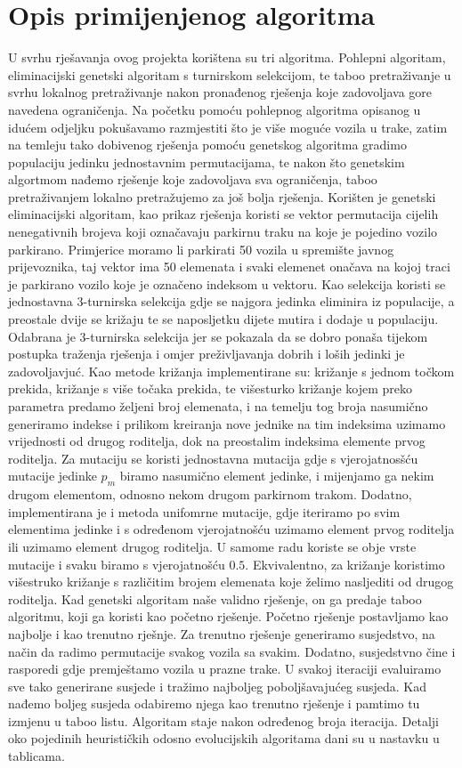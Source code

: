 \documentclass[11pt]{article}
\begin{document}
\section{Opis primijenjenog algoritma}
U svrhu rješavanja ovog projekta korištena su tri algoritma. Pohlepni algoritam, eliminacijski genetski algoritam s turnirskom selekcijom, te taboo pretraživanje u svrhu lokalnog pretraživanje nakon pronađenog rješenja koje zadovoljava gore navedena ograničenja. Na početku pomoću pohlepnog algoritma opisanog u idućem odjeljku pokušavamo razmjestiti što je više moguće vozila u trake, zatim na temleju tako dobivenog rješenja pomoću genetskog algoritma gradimo populaciju jedinku jednostavnim permutacijama, te nakon što genetskim algortmom nađemo rješenje koje zadovoljava sva ograničenja, taboo pretraživanjem lokalno pretražujemo za još bolja rješenja. Korišten je genetski eliminacijski algoritam, kao prikaz rješenja koristi se vektor permutacija cijelih nenegativnih brojeva koji označavaju parkirnu traku na koje je pojedino vozilo parkirano. Primjerice moramo li parkirati 50 vozila u spremište javnog prijevoznika, taj vektor ima 50 elemenata i svaki elemenet onačava na kojoj traci je parkirano vozilo koje je označeno indeksom u vektoru. Kao selekcija koristi se jednostavna 3-turnirska selekcija gdje se najgora jedinka eliminira iz populacije, a preostale dvije se križaju te se naposljetku dijete mutira i dodaje u populaciju. Odabrana je 3-turnirska selekcija jer se pokazala da se dobro ponaša tijekom postupka traženja rješenja i omjer preživljavanja dobrih i loših jedinki je zadovoljavjuć. Kao metode križanja implementirane su: križanje s jednom točkom prekida, križanje s više točaka prekida, te  višesturko križanje kojem preko parametra predamo željeni broj elemenata, i na temelju tog broja nasumično generiramo indekse i prilikom kreiranja nove jednike na tim indeksima uzimamo vrijednosti od drugog roditelja, dok na preostalim indeksima elemente prvog roditelja. Za mutaciju se koristi jednostavna mutacija gdje s vjerojatnosšću mutacije jedinke $p_m$ biramo nasumično element jedinke, i mijenjamo ga nekim drugom elementom, odnosno nekom drugom parkirnom trakom. Dodatno, implementirana je i metoda unifomrne mutacije, gdje iteriramo po svim elementima jedinke i s određenom vjerojatnošću uzimamo element prvog roditelja ili uzimamo element drugog roditelja. U samome radu koriste se obje vrste mutacije i svaku biramo s vjerojatnošću $0.5$. Ekvivalentno, za križanje koristimo višestruko križanje s različitim brojem elemenata koje želimo nasljediti od drugog roditelja. 
Kad genetski algoritam naše validno rješenje, on ga predaje taboo algoritmu, koji ga koristi kao početno rješenje. Početno rješenje postavljamo kao najbolje i kao trenutno rješnje. Za trenutno rješenje generiramo susjedstvo, na način da radimo permutacije svakog vozila sa svakim. Dodatno, susjedstvno čine i rasporedi gdje premještamo vozila u prazne trake. U svakoj iteraciji evaluiramo sve tako generirane susjede i tražimo najboljeg poboljšavajućeg susjeda. Kad nađemo boljeg susjeda odabiremo njega kao trenutno rješenje i pamtimo tu izmjenu u taboo listu. Algoritam staje nakon određenog broja iteracija.
Detalji oko pojedinih heurističkih odosno evolucijskih  algoritama dani su u nastavku u tablicama. 
\end{document}

